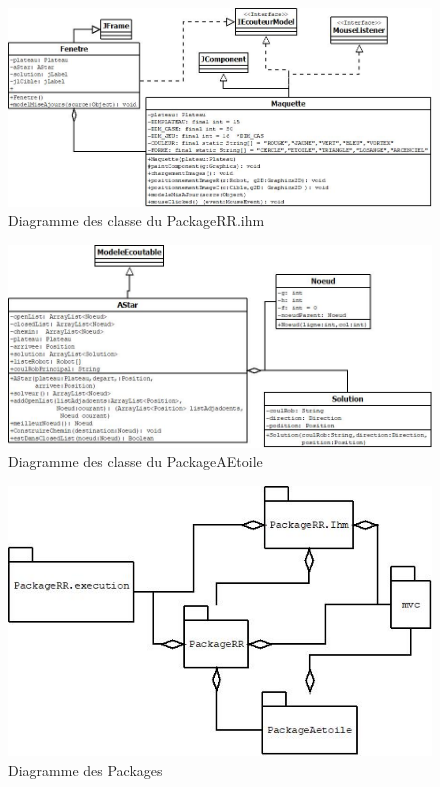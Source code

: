 \documentclass{beamer}
\begin{document}
		\begin{frame}
		\begin{figure}[htpb]
			\includegraphics[scale=0.4]{./images/ihm.jpg}
			\caption{Diagramme des classe du PackageRR.ihm \label{figure1} }
		\end{figure}
	\end{frame}

			\begin{frame}
		\begin{figure}[htpb]
			\includegraphics[scale=0.4]{./images/a.jpg}
			\caption{Diagramme des classe du PackageAEtoile \label{figure1} }
		\end{figure}
	\end{frame}

				\begin{frame}
		\begin{figure}[htpb]
			\includegraphics[scale=0.6]{./images/Package.jpg}
			\caption{Diagramme des Packages \label{figure1} }
		\end{figure}
	\end{frame}
	
\end{document}
